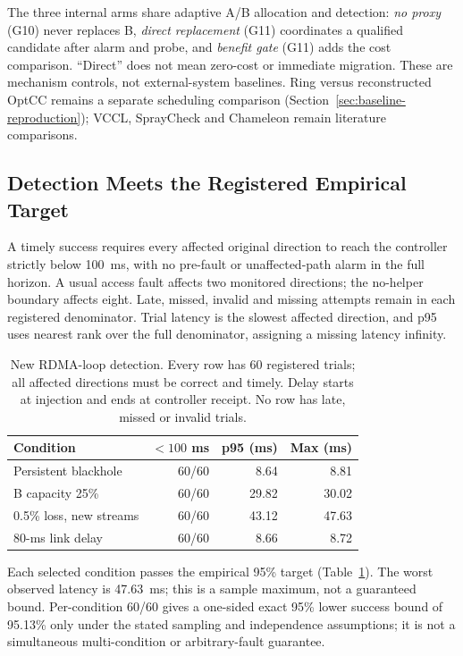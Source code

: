 \documentclass[sigconf]{acmart}
\begin{document}
The three internal arms share adaptive A/B allocation and detection:
\emph{no proxy} (G10) never replaces B, \emph{direct replacement} (G11)
coordinates a qualified candidate after alarm and probe, and \emph{benefit
gate} (G11) adds the cost comparison. ``Direct'' does not mean zero-cost
or immediate migration. These are mechanism controls, not external-system
baselines. Ring versus reconstructed OptCC remains a separate scheduling
comparison (Section~\ref{sec:baseline-reproduction}); VCCL, SprayCheck and
Chameleon remain literature comparisons.

\subsection{Detection Meets the Registered Empirical Target}
\label{sec:primary-validation}
A timely success requires every affected original direction to reach the
controller strictly below 100~ms, with no pre-fault or unaffected-path
alarm in the full horizon. A usual access fault affects two monitored
directions; the no-helper boundary affects eight. Late, missed, invalid
and missing attempts remain in each registered denominator. Trial latency
is the slowest affected direction, and p95 uses nearest rank over the full
denominator, assigning a missing latency infinity.

\begin{table}[t]
\caption{New RDMA-loop detection. Every row has 60 registered trials;
all affected directions must be correct and timely. Delay starts at injection
and ends at controller receipt. No row has late, missed or invalid trials.}
\label{tab:rdma-detection}
\centering\small
\setlength{\tabcolsep}{4pt}
\begin{tabular}{@{}lrrr@{}}
\toprule
Condition & $<100$ ms & p95 (ms) & Max (ms)\\
\midrule
Persistent blackhole & 60/60 & 8.64 & 8.81\\
B capacity 25\% & 60/60 & 29.82 & 30.02\\
0.5\% loss, new streams & 60/60 & 43.12 & 47.63\\
80-ms link delay & 60/60 & 8.66 & 8.72\\
\bottomrule
\end{tabular}
\end{table}

Each selected condition passes the empirical 95\% target
(Table~\ref{tab:rdma-detection}). The worst observed latency is 47.63~ms;
this is a sample maximum, not a guaranteed bound. Per-condition 60/60 gives
a one-sided exact 95\% lower success bound of 95.13\% only under the stated
sampling and independence assumptions; it is not a simultaneous
multi-condition or arbitrary-fault guarantee.
\end{document}
